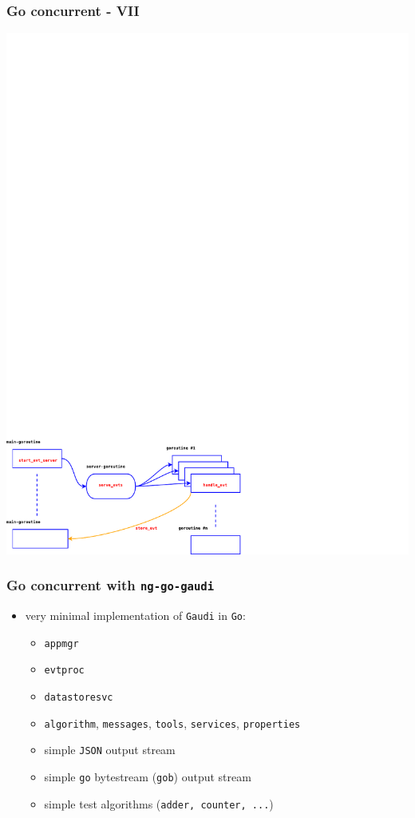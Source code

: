 \documentclass[bigger]{beamer}
\begin{document}
\begin{frame}
\frametitle{Go concurrent - VII}
\label{sec-1-16}


\includegraphics[width=.9\linewidth]{figs/evtproc-diagram.pdf}
\end{frame}
\begin{frame}
\frametitle{Go concurrent with \verb~ng-go-gaudi~}
\label{sec-1-17}


\begin{itemize}
\item very minimal implementation of \verb~Gaudi~ in \verb~Go~:
\begin{itemize}
\item \verb~appmgr~
\item \verb~evtproc~
\item \verb~datastoresvc~
\item \verb~algorithm~, \verb~messages~, \verb~tools~, \verb~services~, \verb~properties~
\item simple \verb~JSON~ output stream
\item simple \verb~go~ bytestream (\verb~gob~) output stream
\item simple test algorithms (\verb~adder, counter, ...~)
\end{itemize}
\end{itemize}
\end{frame}
\end{document}
